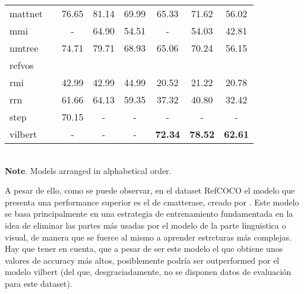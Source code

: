 \begin{table}[p]
\begin{tabular}{lc*6c}
    \acs{mattnet}    & \cite{yu18:mattn}                                            & 76.65          & 81.14          & 69.99          & 65.33          & 71.62          & 56.02          \\
    \acs{mmi}        & \cite{mao16:gener}                                           & -              & 64.90          & 54.51          & -              & 54.03          & 42.81          \\
    \acs{nmtree}     & \cite{liu19:learn_assem_neural_modul_tree}                   & 74.71          & 79.71          & 68.93          & 65.06          & 70.24          & 56.15          \\
    \acs{refvos}     & \cite{bellver20:refvos}                                      &                &                &                &                &                &                \\
    \acs{rmi}        & \cite{liu17:recur_multim_inter_refer_image_segmen}           & 42.99          & 42.99          & 44.99          & 20.52          & 21.22          & 20.78          \\
    \acs{rrn}        & \cite{li18:refer_image_segmen_recur_refin_networ}            & 61.66          & 64.13          & 59.35          & 37.32          & 40.80          & 32.42          \\
    \acs{step}       & \cite{chen19:see_throug_text_group_refer_image_segmen}       & 70.15          & -              & -              & -              & -              & -              \\
    \acs{vilbert}    & \cite{lu19:vilber}                                           & -              & -              & -              & \textbf{72.34} & \textbf{78.52} & \textbf{62.61} \\
    \bottomrule
  \end{tabular}\\[1.25ex]
  {\small\textbf{Note}. Models arranged in alphabetical order.}
\end{table}

A pesar de ello, como se puede observar, en el dataset RefCOCO el modelo que
presenta una performance superior es el de \gls{cmatterase}, creado por
. Este modelo se
basa principalmente en una estrategia de entrenamiento fundamentada en la idea
de eliminar las partes más usadas por el modelo de la parte linguistica o
visual, de manera que se fuerce al mismo a aprender estrcturas más
complejas. Hay que tener en cuenta, que a pesar de ser este modelo el que
obtiene unos valores de accuracy más altos, posiblemente podría ser
outperformed por el modelo \acs{vilbert} (del que, desgraciadamente, no se
disponen datos de evaluación para este dataset).

